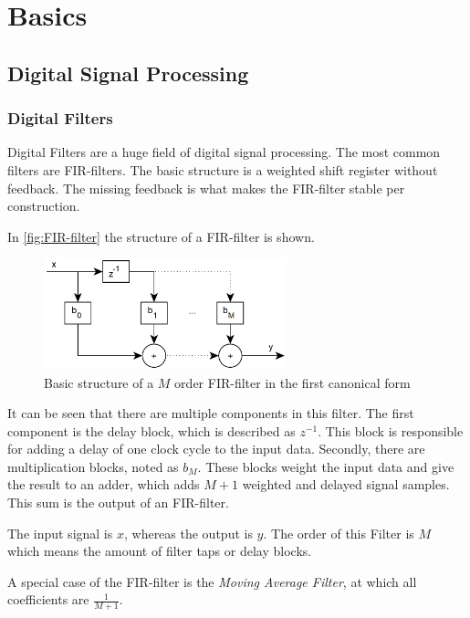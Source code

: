 \section{Basics}

\subsection{Digital Signal Processing}

\subsubsection{Digital Filters}


Digital Filters are a huge field of digital signal processing. The most common filters are \ac{FIR}-filters.
The basic structure is a weighted shift register without feedback. The missing feedback is what makes
the \ac{FIR}-filter stable per construction.

In \autoref{fig:FIR-filter} the structure of a \ac{FIR}-filter is shown.

\begin{figure}[!h]
    \centering
    \includegraphics[width=7cm]{img/fir.png}
    \caption{Basic structure of a $M$ order \ac{FIR}-filter in the first canonical form \cite{meyer_signalverarbeitung}}
    \label{fig:FIR-filter}
\end{figure}

It can be seen that there are multiple components in this filter. The first component is the delay block,
which is described as $z^{-1}$. This block is responsible for adding a delay of one clock cycle to the input data.
Secondly, there are multiplication blocks, noted as $b_M$. These blocks weight the input data and give the
result to an adder, which adds $M+1$ weighted and delayed signal samples. This sum is the output of an
\ac{FIR}-filter.

The input signal is $x$, whereas the output is $y$. The order of this Filter is $M$ which means the amount of
filter taps or delay blocks.

A special case of the \ac{FIR}-filter is the \textit{Moving Average Filter}, at which all coefficients are $\frac{1}{M+1}$.

